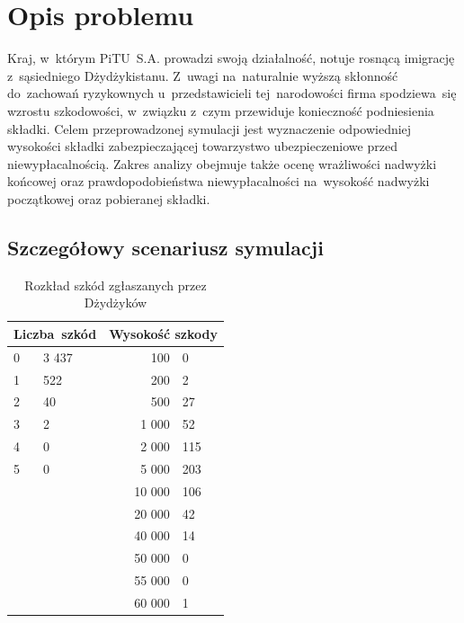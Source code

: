 \documentclass[12pt, a4paper, oneside]{mwart} %
\begin{document}
\section{Opis problemu}
Kraj, w~którym PiTU~S.A. prowadzi swoją działalność, notuje rosnącą imigrację z~sąsiedniego Dżydżykistanu. Z~uwagi na~naturalnie wyższą skłonność do~zachowań ryzykownych u~przedstawicieli tej~narodowości firma spodziewa~się wzrostu szkodowości, w~związku z~czym przewiduje konieczność podniesienia składki. Celem przeprowadzonej symulacji jest wyznaczenie odpowiedniej wysokości składki zabezpieczającej towarzystwo ubezpieczeniowe przed niewypłacalnością. Zakres analizy obejmuje także ocenę wrażliwości nadwyżki końcowej oraz prawdopodobieństwa niewypłacalności na~wysokość nadwyżki początkowej oraz pobieranej składki.

\subsection{Szczegółowy scenariusz symulacji}

\begin{table}
\centering
\caption{Rozkład szkód zgłaszanych przez Dżydżyków}
\label{r_szkod}
\begin{tabular}{p{1cm}|l||r|l}
\multicolumn{2}{c||}{Liczba~szkód}&\multicolumn{2}{c}{Wysokość szkody}\\ \hline
0&3 437&100&0\\
1&522&200&2\\
2&40&500&27\\
3&2&1 000&52\\
4&0&2 000&115\\
5&0&5 000&203\\
&&10 000&106\\
&&20 000&42\\
&&40 000&14\\
&&50 000&0\\
&&55 000&0\\
&&60 000&1\\
\end{tabular}
\end{table}
\end{document}

